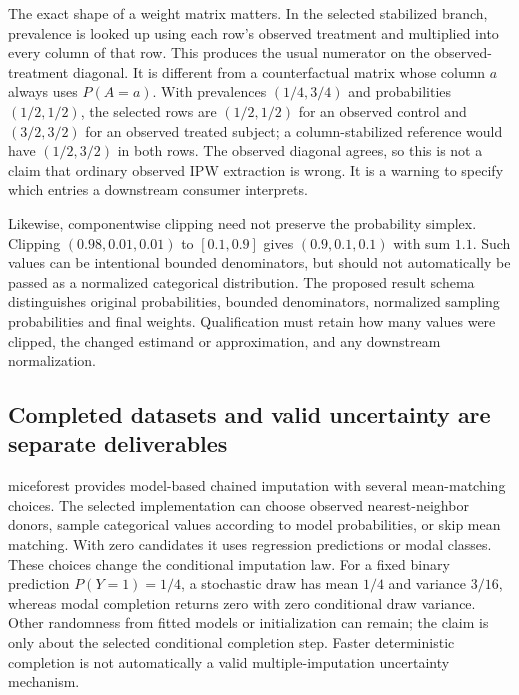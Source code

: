The exact shape of a weight matrix matters. In the selected stabilized branch, prevalence is looked up using each row's observed treatment and multiplied into every column of that row. This produces the usual numerator on the observed-treatment diagonal. It is different from a counterfactual matrix whose column $a$ always uses $P(A=a)$. With prevalences $(1/4,3/4)$ and probabilities $(1/2,1/2)$, the selected rows are $(1/2,1/2)$ for an observed control and $(3/2,3/2)$ for an observed treated subject; a column-stabilized reference would have $(1/2,3/2)$ in both rows. The observed diagonal agrees, so this is not a claim that ordinary observed IPW extraction is wrong. It is a warning to specify which entries a downstream consumer interprets.\citep{exec25_ptm_causallib,exec25_ptm_choice}

Likewise, componentwise clipping need not preserve the probability simplex. Clipping $(0.98,0.01,0.01)$ to $[0.1,0.9]$ gives $(0.9,0.1,0.1)$ with sum $1.1$. Such values can be intentional bounded denominators, but should not automatically be passed as a normalized categorical distribution. The proposed result schema distinguishes original probabilities, bounded denominators, normalized sampling probabilities and final weights. Qualification must retain how many values were clipped, the changed estimand or approximation, and any downstream normalization.\citep{exec25_ptm_causallib,exec25_ptm_choice}

\subsection{Completed datasets and valid uncertainty are separate deliverables}

miceforest provides model-based chained imputation with several mean-matching choices. The selected implementation can choose observed nearest-neighbor donors, sample categorical values according to model probabilities, or skip mean matching. With zero candidates it uses regression predictions or modal classes. These choices change the conditional imputation law. For a fixed binary prediction $P(Y=1)=1/4$, a stochastic draw has mean $1/4$ and variance $3/16$, whereas modal completion returns zero with zero conditional draw variance. Other randomness from fitted models or initialization can remain; the claim is only about the selected conditional completion step. Faster deterministic completion is not automatically a valid multiple-imputation uncertainty mechanism.\citep{exec25_ptm_miceforest,exec25_ptm_choice}

